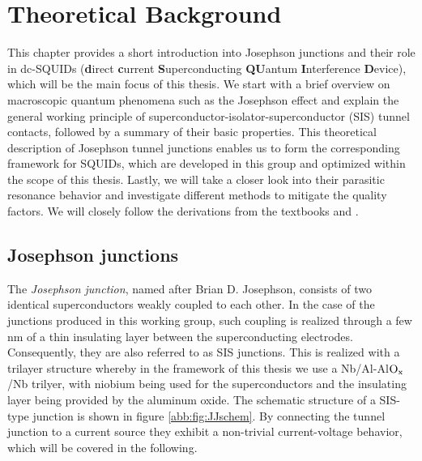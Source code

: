 \chapter{Theoretical Background} \label{ch_theo}


This chapter provides a short introduction into Josephson junctions and their role in dc-SQUIDs (\textbf{d}irect \textbf{c}urrent \textbf{S}uperconducting \textbf{QU}antum \textbf{I}nterference \textbf{D}evice), which will be the main focus of this thesis. We start with a brief overview on macroscopic quantum phenomena such as the Josephson effect and explain the general working principle of superconductor-isolator-superconductor (SIS) tunnel contacts, followed by a summary of their basic properties. This theoretical description of Josephson tunnel junctions enables us to form the corresponding framework for SQUIDs, which are developed in this group and optimized within the scope of this thesis. Lastly, we will take a closer look into their parasitic resonance behavior and investigate different methods to mitigate the quality factors. We will closely follow the derivations from the textbooks \cite{Clarke2004} and \cite{Gross2016}.

\section{Josephson junctions}


The \textit{Josephson junction}, named after Brian D. Josephson, consists of two identical superconductors weakly coupled to each other. In the case of the junctions produced in this working group, such coupling is realized through a few nm of a thin insulating layer between the superconducting electrodes. Consequently, they are also referred to as SIS junctions. This is realized with a trilayer structure whereby in the framework of this thesis we use a Nb/Al-Al$\rm O_x$/Nb trilyer, with niobium being used for the superconductors and the insulating layer being provided by the aluminum oxide. The schematic structure of a SIS-type junction is shown in figure \ref{abb:fig:JJschem}. %
By connecting the tunnel junction to a current source they exhibit a non-trivial current-voltage behavior, which will be covered in the following. 

